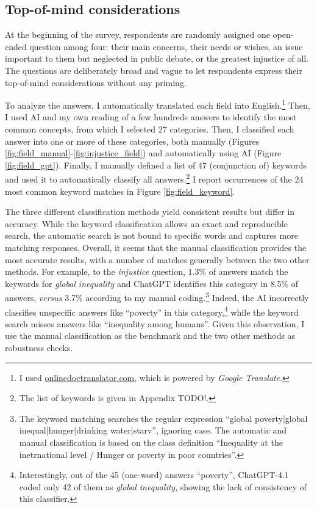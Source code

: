 \documentclass[12pt,english]{article}
\begin{document}
\begin{bibunit}
\subsection{Top-of-mind considerations}\label{subsec:considerations}

At the beginning of the survey, respondents are randomly assigned one open-ended question among four: their main concerns, their needs or wishes, an issue important to them but neglected in public debate, or the greatest injustice of all. The questions are deliberately broad and vague to let respondents express their top-of-mind considerations without any priming. 

To analyze the answers, I automatically translated each field into English.\footnote{I used \href{https://www.onlinedoctranslator.com/en/translationform}{onlinedoctranslator.com}, which is powered by \textit{Google Translate}.} Then, I used AI and my own reading of a few hundreds answers to identify the most common concepts, from which I selected 27 categories. Then, I classified each answer into one or more of these categories, both manually (Figures \ref{fig:field_manual}-\ref{fig:injustice_field}) and automatically using AI (Figure \ref{fig:field_gpt}). Finally, I manually defined a list of 47 (conjunction of) keywords and used it to automatically classify all answers.\footnote{The list of keywords is given in Appendix TODO!.} I report occurrences of the 24 most common keyword matches in Figure \ref{fig:field_keyword}. 

The three different classification methods yield consistent results but differ in accuracy. While the keyword classification allows an exact and reproducible search, the automatic search is not bound to specific words and captures more matching responses. %
Overall, it seems that the manual classification provides the most accurate results, with a number of matches generally between the two other methods. 
For example, to the \textit{injustice} question, 1.3\% of answers match the keywords for \textit{global inequality} and ChatGPT identifies this category in 8.5\% of answers, \textit{versus} 3.7\% according to my manual coding.\footnote{The keyword matching searches the regular expression ``global poverty|global inequal|hunger|drinking water|starv'', ignoring case. The automatic and manual classification is based on the class definition ``Inequality at the inetrnational level / Hunger or poverty in poor countries''.} 
Indeed, the AI incorrectly classifies unspecific answers like ``poverty'' in this category,\footnote{Interestingly, out of the 45 (one-word) answers ``poverty'', ChatGPT-4.1 coded only 42 of them as \textit{global inequality}, showing the lack of consistency of this classifier.} while the keyword search misses answers like ``inequality among humans''. 
Given this observation, I use the manual classification as the benchmark and the two other methods as robustness checks.


\end{bibunit}
\end{document}
